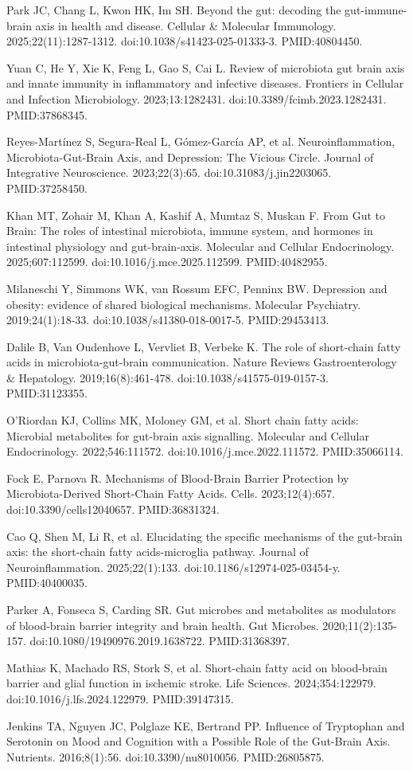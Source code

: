 \documentclass[11pt,oneside]{book}
\newcommand{\reff}[2]{\par\hangindent=7mm\hangafter=1\noindent[#1]\hspace{2mm}#2\par}
\begin{document}
\reff{12}{Park JC, Chang L, Kwon HK, Im SH. Beyond the gut: decoding the gut-immune-brain axis in health and disease. Cellular \& Molecular Immunology. 2025;22(11):1287-1312. doi:10.1038/s41423-025-01333-3. PMID:40804450.}
\reff{13}{Yuan C, He Y, Xie K, Feng L, Gao S, Cai L. Review of microbiota gut brain axis and innate immunity in inflammatory and infective diseases. Frontiers in Cellular and Infection Microbiology. 2023;13:1282431. doi:10.3389/fcimb.2023.1282431. PMID:37868345.}
\reff{14}{Reyes-Martínez S, Segura-Real L, Gómez-García AP, et al. Neuroinflammation, Microbiota-Gut-Brain Axis, and Depression: The Vicious Circle. Journal of Integrative Neuroscience. 2023;22(3):65. doi:10.31083/j.jin2203065. PMID:37258450.}
\reff{15}{Khan MT, Zohair M, Khan A, Kashif A, Mumtaz S, Muskan F. From Gut to Brain: The roles of intestinal microbiota, immune system, and hormones in intestinal physiology and gut-brain-axis. Molecular and Cellular Endocrinology. 2025;607:112599. doi:10.1016/j.mce.2025.112599. PMID:40482955.}
\reff{16}{Milaneschi Y, Simmons WK, van Rossum EFC, Penninx BW. Depression and obesity: evidence of shared biological mechanisms. Molecular Psychiatry. 2019;24(1):18-33. doi:10.1038/s41380-018-0017-5. PMID:29453413.}
\reff{17}{Dalile B, Van Oudenhove L, Vervliet B, Verbeke K. The role of short-chain fatty acids in microbiota-gut-brain communication. Nature Reviews Gastroenterology \& Hepatology. 2019;16(8):461-478. doi:10.1038/s41575-019-0157-3. PMID:31123355.}
\reff{18}{O'Riordan KJ, Collins MK, Moloney GM, et al. Short chain fatty acids: Microbial metabolites for gut-brain axis signalling. Molecular and Cellular Endocrinology. 2022;546:111572. doi:10.1016/j.mce.2022.111572. PMID:35066114.}
\reff{19}{Fock E, Parnova R. Mechanisms of Blood-Brain Barrier Protection by Microbiota-Derived Short-Chain Fatty Acids. Cells. 2023;12(4):657. doi:10.3390/cells12040657. PMID:36831324.}
\reff{20}{Cao Q, Shen M, Li R, et al. Elucidating the specific mechanisms of the gut-brain axis: the short-chain fatty acids-microglia pathway. Journal of Neuroinflammation. 2025;22(1):133. doi:10.1186/s12974-025-03454-y. PMID:40400035.}
\reff{21}{Parker A, Fonseca S, Carding SR. Gut microbes and metabolites as modulators of blood-brain barrier integrity and brain health. Gut Microbes. 2020;11(2):135-157. doi:10.1080/19490976.2019.1638722. PMID:31368397.}
\reff{22}{Mathias K, Machado RS, Stork S, et al. Short-chain fatty acid on blood-brain barrier and glial function in ischemic stroke. Life Sciences. 2024;354:122979. doi:10.1016/j.lfs.2024.122979. PMID:39147315.}
\reff{23}{Jenkins TA, Nguyen JC, Polglaze KE, Bertrand PP. Influence of Tryptophan and Serotonin on Mood and Cognition with a Possible Role of the Gut-Brain Axis. Nutrients. 2016;8(1):56. doi:10.3390/nu8010056. PMID:26805875.}
\end{document}
